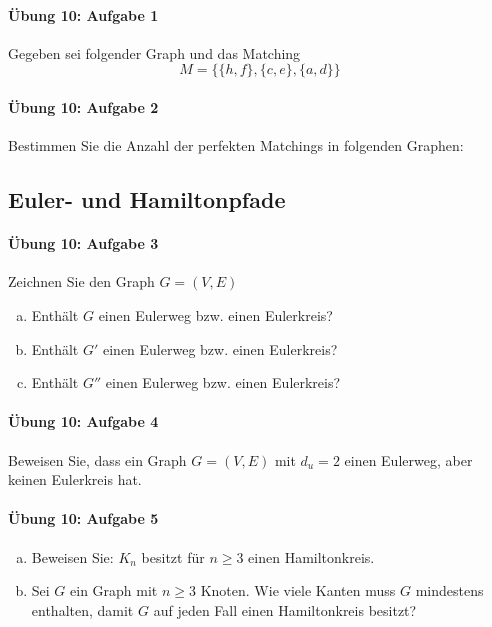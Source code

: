 \documentclass
[
  draft    = true,
  fontsize = 11pt,
  parskip  = half-,
  BCOR     = 0pt,
  DIV      = 11,
  ngerman,
  dvipsnames
]
{scrartcl}
\begin{document}
\paragraph{Übung 10: Aufgabe 1}
Gegeben sei folgender Graph und das Matching
\begin{equation*}
  M=\{\{h,f\},\{c,e\},\{a,d\}\}
\end{equation*}

\paragraph{Übung 10: Aufgabe 2}
Bestimmen Sie die Anzahl der perfekten Matchings in folgenden Graphen:

\subsection{Euler- und Hamiltonpfade}

\paragraph{Übung 10: Aufgabe 3}
Zeichnen Sie den Graph $G=(V,E)$
\begin{enumerate}[a)]
  \item Enthält $G$ einen Eulerweg bzw. einen Eulerkreis?
  \item Enthält $G'$ einen Eulerweg bzw. einen Eulerkreis?
  \item Enthält $G''$ einen Eulerweg bzw. einen Eulerkreis?
\end{enumerate}

\paragraph{Übung 10: Aufgabe 4}
Beweisen Sie, dass ein Graph $G=(V,E)$ mit $d_u=2$ einen Eulerweg, aber
keinen Eulerkreis hat.

\paragraph{Übung 10: Aufgabe 5}
\begin{enumerate}[a)]
  \item Beweisen Sie: $K_n$ besitzt für $n\geq3$ einen Hamiltonkreis.
  \item Sei $G$ ein Graph mit $n\geq3$ Knoten. Wie viele Kanten muss $G$
        mindestens enthalten, damit $G$ auf jeden Fall einen Hamiltonkreis
        besitzt?
\end{enumerate}
\end{document}
